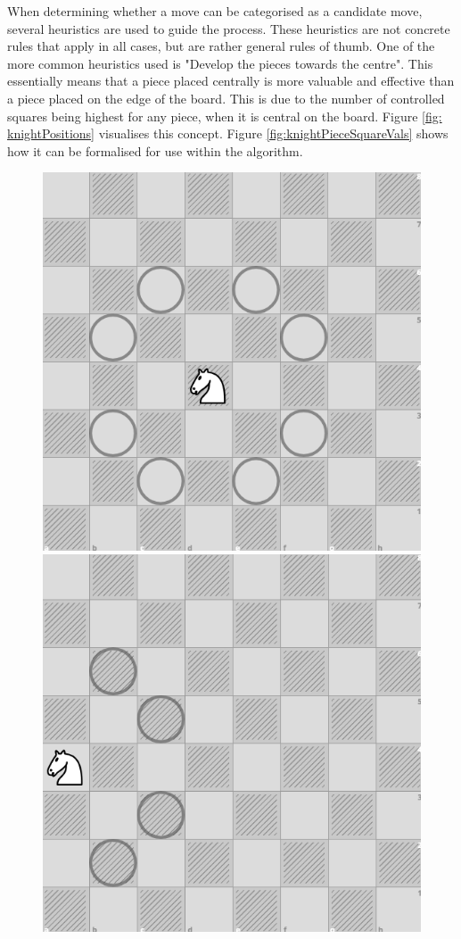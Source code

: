 When determining whether a move can be categorised as a candidate move, several heuristics are used to guide the process. These heuristics are not concrete rules that apply in all cases, but are rather general rules of thumb. One of the more common heuristics used is "Develop the pieces towards the centre". This essentially means that a piece placed centrally is more valuable and effective than a piece placed on the edge of the board. This is due to the number of controlled squares being highest for any piece, when it is central on the board. Figure \ref{fig: knightPositions} visualises this concept. Figure \ref{fig:knightPieceSquareVals} shows how it can be formalised for use within the algorithm.
\begin{figure}[H]
    \centering
    \includegraphics[scale=0.25]{images/centralKnight.png}
    \includegraphics[scale=0.25]{images/rimKnight.png}

\end{figure}
